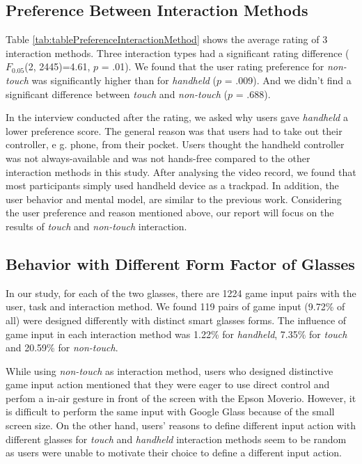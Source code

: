 \documentclass{sigchi}
\begin{document}
  \subsection{Preference Between Interaction Methods}
  Table \ref{tab:tablePreferenceInteractionMethod} shows the average rating of 3 interaction methods. Three interaction types had a significant rating difference ($F_{0.05}$(2, 2445)=4.61, $p$ = .01). We found that the user rating preference for \emph{non-touch} was significantly higher than for \emph{handheld} ($p$ = .009). And we didn't find a significant difference between \emph{touch} and \emph{non-touch} ($p$ = .688).
  
  In the interview conducted after the rating, we asked why users gave \emph{handheld} a lower preference score.
  The general reason was that users had to take out their controller, e g. phone, from their pocket. Users thought the handheld controller was not always-available and was not hands-free compared to the other interaction methods in this study. After analysing the video record, we found that most participants simply used handheld device as a trackpad. In addition, the user behavior and mental model, are similar to the previous work\cite{Liang:2012:USG:2350046.2350098}. Considering the user preference and reason mentioned above, our report will focus on the results of \emph{touch} and \emph{non-touch} interaction.

  \subsection{Behavior with Different Form Factor of Glasses}
  In our study, for each of the two glasses, there are 1224 game input pairs with the user, task and interaction method. We found 119 pairs of game input (9.72\% of all) were designed differently with distinct smart glasses forms. The influence of game input in each interaction method was 1.22\% for \emph{handheld}, 7.35\% for \emph{touch} and 20.59\% for \emph{non-touch}.

  While using \emph{non-touch} as interaction method, users who designed distinctive game input action mentioned that they were eager to use direct control and perfom a in-air gesture in front of the screen with the Epson Moverio. However, it is difficult to perform the same input with Google Glass because of the small screen size. On the other hand, users' reasons to define different input action with different glasses for \emph{touch} and \emph{handheld} interaction methods seem to be random as users were unable to motivate their choice to define a different input action.
\end{document}
